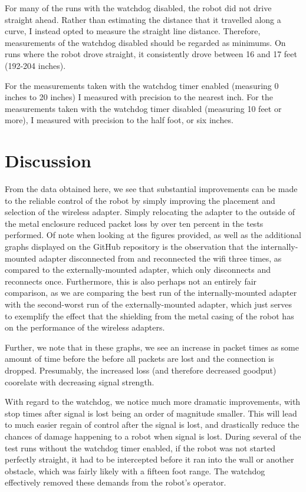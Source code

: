 \documentclass{IEEEtran}
\begin{document}
For many of the runs with the watchdog disabled, the robot did not drive
straight ahead. Rather than estimating the distance that it travelled along
a curve, I instead opted to measure the straight line distance. Therefore,
measurements of the watchdog disabled should be regarded as minimums. On runs
where the robot drove straight, it consistently drove between 16 and 17 feet
(192-204 inches). 

For the measurements taken with the watchdog timer enabled (measuring 0 inches
to 20 inches) I measured with precision to the nearest inch.
For the measurements taken with the watchdog timer disabled (measuring 10 feet
or more), I measured with precision to the half foot, or six inches.


\section{Discussion}
From the data obtained here, we see that substantial improvements can be made
to the reliable control of the robot by simply improving the placement and
selection of the wireless adapter. Simply relocating the adapter to the outside
of the metal enclosure reduced packet loss by over ten percent in the tests
performed. Of note when looking at the figures provided, as well as the
additional graphs displayed on the GitHub repository\cite{uropgithub} is the
observation that the internally-mounted adapter disconnected from and
reconnected the wifi three times, as compared to the externally-mounted
adapter, which only disconnects and reconnects once.
Furthermore, this is also perhaps not an entirely fair comparison, as we are
comparing the best run of the internally-mounted adapter with the second-worst
run of the externally-mounted adapter, which just serves to exemplify the
effect that the shielding from the metal casing of the robot has on the
performance of the wireless adapters.

Further, we note that in these graphs, we see an increase in packet times as
some amount of time before the before all packets are lost and the connection
is dropped. Presumably, the increased loss (and therefore decreased goodput)
coorelate with decreasing signal strength. 

With regard to the watchdog, we notice much more dramatic improvements, with
stop times after signal is lost being an order of magnitude smaller. This will
lead to much easier regain of control after the signal is lost, and
drastically reduce the chances of damage happening to a robot when signal is
lost. During several of the test runs without the watchdog timer enabled, if 
the robot was not started perfectly straight, it had to be intercepted before
it ran into the wall or another obstacle, which was fairly likely with a
fifteen foot range. The watchdog effectively removed these demands from the
robot's operator.
\end{document}
